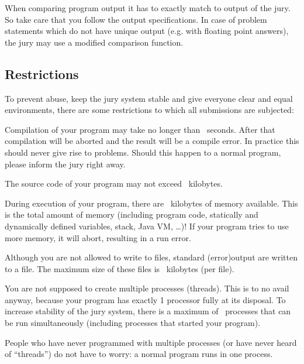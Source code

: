 When comparing program output it has to exactly match to output of
the jury. So take care that you follow the output specifications. In
case of problem statements which do not have unique output (e.g. with
floating point answers), the jury may use a modified comparison
function.

\subsection{Restrictions}\label{runlimits}

To prevent abuse, keep the jury system stable and give everyone
clear and equal environments, there are some restrictions to which all
submissions are subjected:

\begin{description}
\item[compile time]
Compilation of your program may take no longer than \COMPILETIME\
seconds. After that compilation will be aborted and the result will
be a compile error. In practice this should never give rise to
problems. Should this happen to a normal program, please inform the
jury right away.

\item[source size]
The source code of your program may not exceed \SOURCESIZE\ kilobytes.

\item[memory]
During execution of your program, there are \MEMLIMIT\ kilobytes of
memory available. This is the total amount of memory (including
program code, statically and dynamically defined variables, stack,
Java VM, \dots)! If your program tries to use more memory, it will
abort, resulting in a run error.

\item[output size]
Although you are not allowed to write to files, standard (error)output
are written to a file. The maximum size of these files is \FILELIMIT\
kilobytes (per file).

\item[number of processes]
You are not supposed to create multiple processes (threads). This is
to no avail anyway, because your program has exactly 1 processor fully
at its disposal. To increase stability of the jury system, there is a
maximum of \PROCLIMIT\ processes that can be run simultaneously
(including processes that started your program).

People who have never programmed with multiple processes (or have
never heard of ``threads'') do not have to worry: a normal program
runs in one process.

\end{description}

